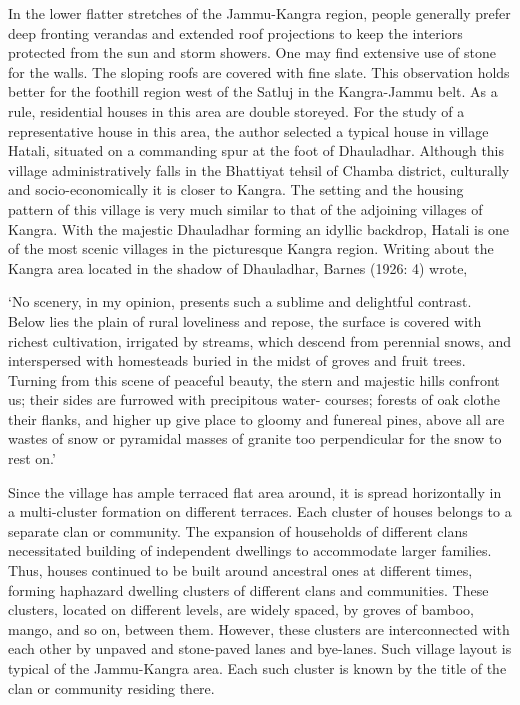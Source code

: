 In the lower flatter stretches of the Jammu-Kangra region, people generally prefer deep fronting verandas and extended roof projections to keep the interiors protected from the sun and storm showers. One may find extensive use of stone for the walls. The sloping roofs are covered with fine slate. This observation holds better for the foothill region west of the Satluj in the Kangra-Jammu belt. As a rule, residential houses in this area are double storeyed. For the study of a representative house in this area, the author selected a typical house in village Hatali, situated on a commanding spur at the foot of Dhauladhar. Although this village administratively falls in the Bhattiyat tehsil of Chamba district, culturally and socio-economically it is closer to Kangra. The setting and the housing pattern of this village is very much similar to that of the adjoining villages of Kangra. With the majestic Dhauladhar forming an idyllic backdrop, Hatali is one of the most scenic villages in the picturesque Kangra region. Writing about the Kangra area located in the shadow of Dhauladhar, Barnes (1926: 4) wrote,

\begin{myquote}
‘No scenery, in my opinion, presents such a sublime and delightful contrast. Below lies the plain of rural loveliness and repose, the surface is covered with richest cultivation, irrigated by streams, which descend from perennial snows, and interspersed with homesteads buried in the midst of groves and fruit trees. Turning from this scene of peaceful beauty, the stern and majestic hills confront us; their sides are furrowed with precipitous water- courses; forests of oak clothe their flanks, and higher up give place to gloomy and funereal pines, above all are wastes of snow or pyramidal masses of granite too perpendicular for the snow to rest on.’
\end{myquote}

Since the village has ample terraced flat area around, it is spread horizontally in a multi-cluster formation on different terraces. Each cluster of houses belongs to a separate clan or community. The expansion of households of different clans necessitated building of independent dwellings to accommodate larger families. Thus, houses continued to be built around ancestral ones at different times, forming haphazard dwelling clusters of different clans and communities. These clusters, located on different levels, are widely spaced, by groves of bamboo, mango, and so on, between them. However, these clusters are interconnected with each other by unpaved and stone-paved lanes and bye-lanes. Such village layout is typical of the Jammu-Kangra area. Each such cluster is known by the title of the clan or community residing there.


